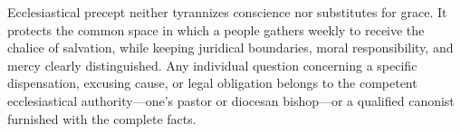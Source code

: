Ecclesiastical precept neither tyrannizes conscience nor substitutes for grace. It protects the common space in which a people gathers weekly to receive the chalice of salvation, while keeping juridical boundaries, moral responsibility, and mercy clearly distinguished. Any individual question concerning a specific dispensation, excusing cause, or legal obligation belongs to the competent ecclesiastical authority---one's pastor or diocesan bishop---or a qualified canonist furnished with the complete facts.
